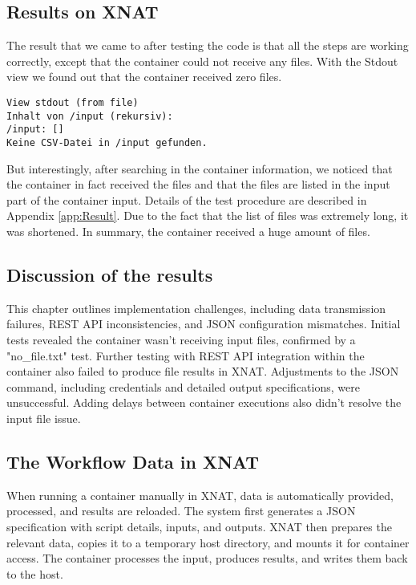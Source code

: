 \subsection{Results on XNAT}
The result that we came to after testing the code is that all the steps are working correctly, except that the container could not receive any files. With the \ac{Stdout} view we found out that the container received zero files. 
 
\begin{lstlisting}[numbers=none]
View stdout (from file)
Inhalt von /input (rekursiv):
/input: []
Keine CSV-Datei in /input gefunden.
\end{lstlisting}

\normalsize
But interestingly, after searching in the container information, we noticed that the container in fact received the files and that the files are listed in the input part of the container input. 
Details of the test procedure are described in Appendix 
\ref{app:Result}. Due to the fact that the list of files was extremely long, it was shortened. In summary, the container received a huge amount of files.
\normalsize
\subsection{Discussion of the results}
This chapter outlines implementation challenges, including data transmission failures, REST API inconsistencies, and JSON configuration mismatches. Initial tests revealed the container wasn't receiving input files, confirmed by a "no\_file.txt" test. Further testing with REST API integration within the container also failed to produce file results in XNAT. Adjustments to the JSON command, including credentials and detailed output specifications, were unsuccessful. Adding delays between container executions also didn't resolve the input file issue.




\normalsize



\subsection{The Workflow Data in XNAT}

When running a container manually in XNAT, data is automatically provided, processed, and results are reloaded. The system first generates a JSON specification with script details, inputs, and outputs. XNAT then prepares the relevant data, copies it to a temporary host directory, and mounts it for container access. The container processes the input, produces results, and writes them back to the host.

